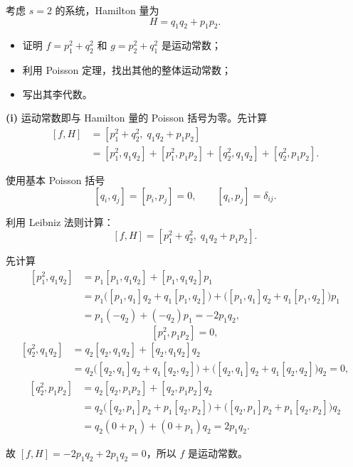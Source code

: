 \begin{question}
考虑 \(s=2\) 的系统，Hamilton 量为
\[
H = q_1q_2 + p_1p_2.
\]
\begin{itemize}
  \item[\textup{(i)}] 证明 \(f = p_1^2+q_2^2\) 和 \(g = p_2^2+q_1^2\) 是运动常数；
  \item[\textup{(ii)}] 利用 Poisson 定理，找出其他的整体运动常数；
  \item[\textup{(iii)}] 写出其李代数。
\end{itemize}
\begin{solution}
\textbf{(i)} 运动常数即与 Hamilton 量的 Poisson 括号为零。先计算
\[
\begin{aligned}
[f,H] &= [p_1^2+q_2^2,\;q_1q_2+p_1p_2] \\
&= [p_1^2,q_1q_2] + [p_1^2,p_1p_2]
+ [q_2^2,q_1q_2] + [q_2^2,p_1p_2].
\end{aligned}
\]

使用基本 Poisson 括号
\[
[q_i,q_j]=[p_i,p_j]=0,\qquad [q_i,p_j]=\delta_{ij}.
\]

利用 Leibniz 法则计算：
\[
[f,H] = [p_1^2+q_2^2,\;q_1q_2+p_1p_2].
\]

先计算
\[
\begin{aligned}
[p_1^2, q_1q_2] &= p_1[p_1,q_1q_2] + [p_1,q_1q_2]p_1 \\
&= p_1\bigl([p_1,q_1]q_2+q_1[p_1,q_2]\bigr)
+\bigl([p_1,q_1]q_2+q_1[p_1,q_2]\bigr)p_1 \\
&= p_1(-q_2)+(-q_2)p_1 = -2p_1q_2,
\end{aligned}
\]
\[
[p_1^2,p_1p_2]=0,
\]
\[
\begin{aligned}
[q_2^2,q_1q_2] &= q_2[q_2,q_1q_2] + [q_2,q_1q_2]q_2 \\
&= q_2\bigl([q_2,q_1]q_2+q_1[q_2,q_2]\bigr)
+\bigl([q_2,q_1]q_2+q_1[q_2,q_2]\bigr)q_2 = 0,
\end{aligned}
\]
\[
\begin{aligned}
[q_2^2,p_1p_2] &= q_2[q_2,p_1p_2] + [q_2,p_1p_2]q_2 \\
&= q_2\bigl([q_2,p_1]p_2+p_1[q_2,p_2]\bigr)
+\bigl([q_2,p_1]p_2+p_1[q_2,p_2]\bigr)q_2 \\
&= q_2(0+p_1)+(0+p_1)q_2 = 2p_1q_2.
\end{aligned}
\]

故 \([f,H]=-2p_1q_2+2p_1q_2=0\)，所以 \(f\) 是运动常数。


\end{solution}
\end{question}

